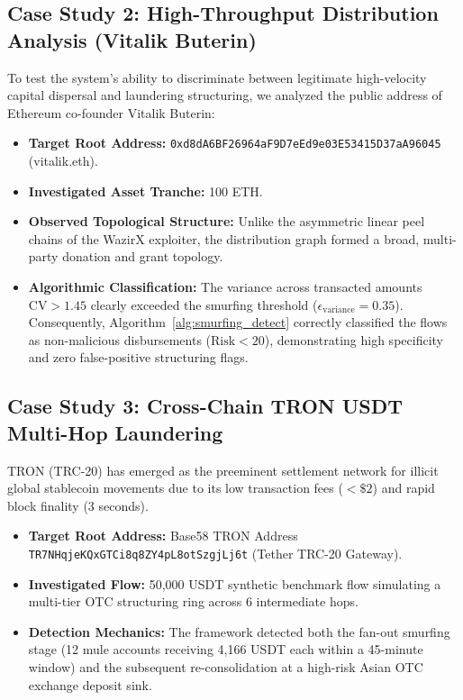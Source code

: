 \subsection{Case Study 2: High-Throughput Distribution Analysis (Vitalik Buterin)}

To test the system's ability to discriminate between legitimate high-velocity capital dispersal and laundering structuring, we analyzed the public address of Ethereum co-founder Vitalik Buterin:
\begin{itemize}
    \item \textbf{Target Root Address:} \texttt{\small 0xd8dA6BF26964aF9D7eEd9e03E53415D37aA96045} (vitalik.eth).
    \item \textbf{Investigated Asset Tranche:} 100 ETH.
    \item \textbf{Observed Topological Structure:} Unlike the asymmetric linear peel chains of the WazirX exploiter, the distribution graph formed a broad, multi-party donation and grant topology.
    \item \textbf{Algorithmic Classification:} The variance across transacted amounts $\text{CV} > 1.45$ clearly exceeded the smurfing threshold ($\epsilon_{\text{variance}} = 0.35$). Consequently, Algorithm~\ref{alg:smurfing_detect} correctly classified the flows as non-malicious disbursements ($\text{Risk} < 20$), demonstrating high specificity and zero false-positive structuring flags.
\end{itemize}

\subsection{Case Study 3: Cross-Chain TRON USDT Multi-Hop Laundering}

TRON (TRC-20) has emerged as the preeminent settlement network for illicit global stablecoin movements due to its low transaction fees ($< \$2$) and rapid block finality (3 seconds).

\begin{itemize}
    \item \textbf{Target Root Address:} Base58 TRON Address \\ \texttt{\small TR7NHqjeKQxGTCi8q8ZY4pL8otSzgjLj6t} (Tether TRC-20 Gateway).
    \item \textbf{Investigated Flow:} 50,000 USDT synthetic benchmark flow simulating a multi-tier OTC structuring ring across 6 intermediate hops.
    \item \textbf{Detection Mechanics:} The framework detected both the fan-out smurfing stage (12 mule accounts receiving 4,166 USDT each within a 45-minute window) and the subsequent re-consolidation at a high-risk Asian OTC exchange deposit sink.
\end{itemize}


